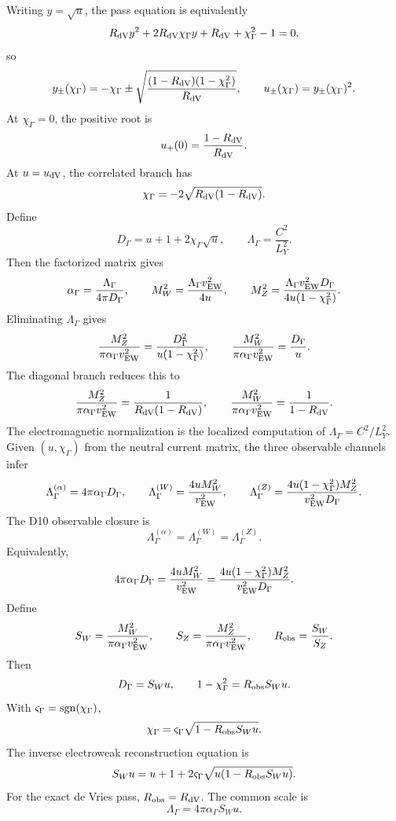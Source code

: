 \documentclass[11pt]{article}
\theoremstyle{definition}
\theoremstyle{remark}
\begin{document}
Writing \(y=\sqrt u\), the pass equation is equivalently
\[
  R_{\rm dV}y^2
  +2R_{\rm dV}\chi_\Gamma y
  +R_{\rm dV}+\chi_\Gamma^2-1
  =
  0,
\]
so
\[
  y_\pm(\chi_\Gamma)
  =
  -\chi_\Gamma
  \pm
  \sqrt{\frac{(1-R_{\rm dV})(1-\chi_\Gamma^2)}{R_{\rm dV}}},
  \qquad
  u_\pm(\chi_\Gamma)=y_\pm(\chi_\Gamma)^2 .
\]
At \(\chi_\Gamma=0\), the positive root is
\[
  u_+(0)=\frac{1-R_{\rm dV}}{R_{\rm dV}}.
\]
At \(u=u_{\rm dV}\), the correlated branch has
\[
  \chi_\Gamma=-2\sqrt{R_{\rm dV}(1-R_{\rm dV})}.
\]
Define
\[
  D_\Gamma=u+1+2\chi_\Gamma\sqrt u,
  \qquad
  \Lambda_\Gamma=\frac{C^2}{L_Y^2}.
\]
Then the factorized matrix gives
\[
  \alpha_\Gamma
  =
  \frac{\Lambda_\Gamma}{4\pi D_\Gamma},
  \qquad
  M_W^2
  =
  \frac{\Lambda_\Gamma v_{\rm EW}^2}{4u},
  \qquad
  M_Z^2
  =
  \frac{\Lambda_\Gamma v_{\rm EW}^2D_\Gamma}
       {4u(1-\chi_\Gamma^2)}.
\]
Eliminating \(\Lambda_\Gamma\) gives
\[
  \frac{M_Z^2}{\pi\alpha_\Gamma v_{\rm EW}^2}
  =
  \frac{D_\Gamma^2}{u(1-\chi_\Gamma^2)},
  \qquad
  \frac{M_W^2}{\pi\alpha_\Gamma v_{\rm EW}^2}
  =
  \frac{D_\Gamma}{u}.
\]
The diagonal branch reduces this to
\[
  \frac{M_Z^2}{\pi\alpha_\Gamma v_{\rm EW}^2}
  =
  \frac{1}{R_{\rm dV}(1-R_{\rm dV})},
  \qquad
  \frac{M_W^2}{\pi\alpha_\Gamma v_{\rm EW}^2}
  =
  \frac{1}{1-R_{\rm dV}}.
\]
The electromagnetic normalization is the localized computation of
\(\Lambda_\Gamma=C^2/L_Y^2\).
Given \((u,\chi_\Gamma)\) from the neutral current matrix, the three
observable channels infer
\[
  \Lambda_\Gamma^{(\alpha)}
  =
  4\pi\alpha_\Gamma D_\Gamma,
  \qquad
  \Lambda_\Gamma^{(W)}
  =
  \frac{4uM_W^2}{v_{\rm EW}^2},
  \qquad
  \Lambda_\Gamma^{(Z)}
  =
  \frac{4u(1-\chi_\Gamma^2)M_Z^2}
       {v_{\rm EW}^2D_\Gamma}.
\]
The D10 observable closure is
\[
  \Lambda_\Gamma^{(\alpha)}
  =
  \Lambda_\Gamma^{(W)}
  =
  \Lambda_\Gamma^{(Z)}.
\]
Equivalently,
\[
  4\pi\alpha_\Gamma D_\Gamma
  =
  \frac{4uM_W^2}{v_{\rm EW}^2}
  =
  \frac{4u(1-\chi_\Gamma^2)M_Z^2}
       {v_{\rm EW}^2D_\Gamma}.
\]
Define
\[
  S_W=
  \frac{M_W^2}{\pi\alpha_\Gamma v_{\rm EW}^2},
  \qquad
  S_Z=
  \frac{M_Z^2}{\pi\alpha_\Gamma v_{\rm EW}^2},
  \qquad
  R_{\rm obs}=\frac{S_W}{S_Z}.
\]
Then
\[
  D_\Gamma=S_Wu,
  \qquad
  1-\chi_\Gamma^2=R_{\rm obs}S_Wu.
\]
With \(\varsigma_\Gamma={\rm sgn}(\chi_\Gamma)\),
\[
  \chi_\Gamma
  =
  \varsigma_\Gamma
  \sqrt{1-R_{\rm obs}S_Wu}.
\]
The inverse electroweak reconstruction equation is
\[
  S_Wu
  =
  u+1+
  2\varsigma_\Gamma
  \sqrt{u(1-R_{\rm obs}S_Wu)}.
\]
For the exact de Vries pass, \(R_{\rm obs}=R_{\rm dV}\).  The common scale is
\[
  \Lambda_\Gamma=4\pi\alpha_\Gamma S_Wu.
\]
\end{document}
